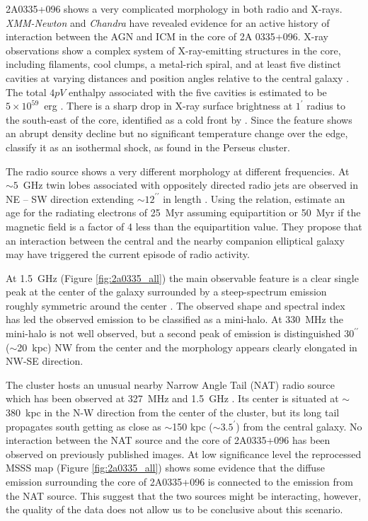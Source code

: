 \documentclass{aa}  %
\begin{document}
2A0335+096 shows a very complicated morphology in both radio and X-rays.
\textit{XMM-Newton} and \textit{Chandra} have revealed evidence for an active history of interaction between the AGN and ICM in the core of 2A 0335+096.
X-ray observations show a complex system of X-ray-emitting structures in the core, including filaments, cool clumps, a metal-rich spiral, and at least five distinct cavities at varying distances and position angles relative to the central galaxy \citep{Mazzotta2003, Birzan2004, Kaastra2004, SandersFabian2006, Sanders2009}. 
The total $4pV$ enthalpy associated with the five cavities is estimated to be $5\times10^{59}$~erg \citep{Sanders2009}.
There is a sharp drop in X-ray surface brightness at $1^{\prime}$ radius to the south-east of the core, identified as a cold front by \cite{Mazzotta2003}.
Since the feature shows an abrupt density decline but no significant temperature change over the edge, \cite{SandersFabian2006} classify it as an isothermal shock, as found in the Perseus cluster.

The radio source shows a very different morphology at different frequencies. At $\sim5$~GHz twin lobes associated with oppositely directed radio jets are observed in NE -- SW direction extending $\sim12^{\prime\prime}$ in length \citep{Sanders2009}.
Using the \cite{Myers1985} relation, \cite{Donahue2007} estimate an age for the radiating electrons of 25~Myr assuming equipartition or 50~Myr if the magnetic field is a factor of 4 less than the equipartition value.
They propose that an interaction between the central and the nearby companion elliptical galaxy may have triggered the current episode of radio activity.

At 1.5~GHz (Figure \ref{fig:2a0335_all}) the main observable feature is a clear single peak at the center of the galaxy surrounded by a steep-spectrum emission roughly symmetric around the center \citep{Sarazin1995, Birzan2008, Sanders2009}. 
The observed shape and spectral index has led the observed emission to be classified as a mini-halo.
At 330~MHz the mini-halo is not well observed, but a second peak of emission is distinguished $30^{\prime\prime}$ ($\sim$20~kpc) NW from the center \citep{Birzan2008} and the morphology appears clearly elongated in NW-SE direction.

The cluster hosts an unusual nearby Narrow Angle Tail (NAT) radio source which has been observed at 327~MHz \citep{Patnaik1988} and 1.5~GHz \citep{Odea1985, Sarazin1995}. Its center is situated at $\sim$380~kpc in the N-W direction from the center of the cluster, but its long tail propagates south getting as close as $\sim$150 kpc ($\sim3.5^{\prime}$) from the central galaxy.
No interaction between the NAT source and the core of 2A0335+096 has been observed on previously published images.
At low significance level the reprocessed MSSS map (Figure \ref{fig:2a0335_all}) shows some evidence that the diffuse emission surrounding the core of 2A0335+096 is connected to the emission from the NAT source. This suggest that the two sources might be interacting, however, the quality of the data does not allow us to be conclusive about this scenario.
\end{document}
